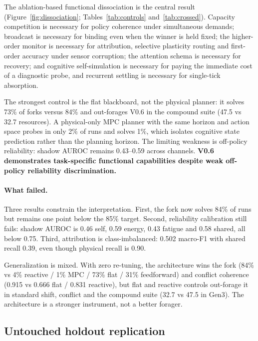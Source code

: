\documentclass{article}
\begin{document}
The ablation-based functional dissociation is the central result (Figure~\ref{fig:dissociation}; Tables~\ref{tab:controls} and~\ref{tab:crossed}). Capacity competition is necessary for policy
coherence under simultaneous demands; broadcast is necessary for binding even when the winner is
held fixed; the higher-order monitor is necessary for attribution, selective plasticity routing and
first-order accuracy under sensor corruption; the attention schema is necessary for recovery; and
cognitive self-simulation is necessary for paying the immediate cost of a diagnostic probe, and
recurrent settling is necessary for single-tick absorption.

The strongest control is the flat blackboard, not the physical planner: it solves 73\% of forks
versus 84\% and out-forages V0.6 in the compound suite (47.5 vs 32.7 resources). A physical-only MPC
planner with the same horizon and action space probes in only 2\% of runs and solves 1\%, which
isolates cognitive state prediction rather than the planning horizon. The limiting weakness is
off-policy reliability: shadow AUROC remains 0.43--0.59 across channels. \textbf{V0.6 demonstrates
task-specific functional capabilities despite weak off-policy reliability discrimination.}

\paragraph{What failed.}
Three results constrain the interpretation. First, the fork now solves 84\% of runs but remains
one point below the 85\% target. Second, reliability calibration still fails: shadow AUROC is 0.46
self, 0.59 energy, 0.43 fatigue and 0.58 shared, all below 0.75. Third, attribution is
class-imbalanced: 0.502 macro-F1 with shared recall 0.39, even though physical recall is 0.90.

Generalization is mixed. With zero re-tuning, the architecture wins the fork (84\% vs 4\%
reactive / 1\% MPC / 73\% flat / 31\% feedforward) and conflict coherence (0.915 vs 0.666
flat / 0.831 reactive), but flat and reactive controls out-forage it in standard shift, conflict
and the compound suite (32.7 vs 47.5 in Gen3). The architecture is a stronger instrument, not a
better forager.

\subsection{Untouched holdout replication}
\end{document}
